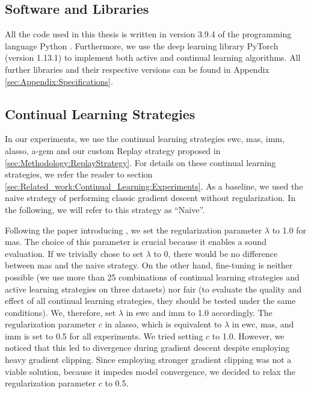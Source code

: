 \subsection{Software and Libraries}
\label{sec:ExperimentSetup:Software}
All the code used in this thesis is written in version 3.9.4 of the programming language Python \cite{Rossum1995Python}. Furthermore, we use the deep
learning library PyTorch \cite{paszke2019pytorch} (version 1.13.1) to implement both active and continual learning algorithms. All further libraries
and their respective versions can be found in Appendix \ref{sec:Appendix:Specifications}.

\subsection{Continual Learning Strategies}
\label{sec:ExperimentSetup:CLStrategies}
In our experiments, we use the continual learning strategies \gls{ewc}, \gls{mas}, \gls{imm}, \gls{alasso}, \gls{a-gem} and our custom Replay strategy
proposed in \ref{sec:Methodology:ReplayStrategy}. For details on these continual learning strategies, we refer the reader to section 
\ref{sec:Related_work:Continual_Learning:Experiments}. As a baseline, we used the naive strategy of performing classic gradient descent without 
regularization. In the following, we will refer to this strategy as \enquote{Naive}. \par
Following the paper introducing \cite{mas} \cite{aljundi2018memory}, we set the regularization parameter $\lambda$ to 1.0 for \gls{mas}. The choice of
this parameter is crucial because it enables a sound evaluation. If we trivially chose to set $\lambda$ to 0, there would be no difference between
\gls{mas} and the naive strategy. On the other hand, fine-tuning is neither possible (we use more than 25 combinations of continual learning strategies and
active learning strategies on three datasets) nor fair (to evaluate the quality and effect of all continual learning strategies, they should be tested under
the same conditions). We, therefore, set $\lambda$ in \gls{ewc} and \gls{imm} to 1.0 accordingly.
The regularization parameter $c$ in \gls{alasso}, which is equivalent to $\lambda$ in \gls{ewc}, \gls{mas}, and \gls{imm} is set to 0.5 for all experiments.
We tried setting $c$ to 1.0. However, we noticed that this led to divergence during gradient descent despite employing heavy gradient clipping. Since employing
stronger gradient clipping was not a viable solution, because it impedes model convergence, we decided to relax the regularization parameter $c$ to 0.5. \par
